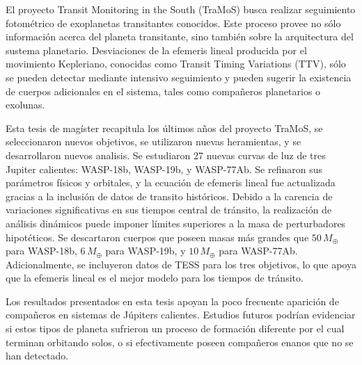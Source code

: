 \begin{resumen}
El proyecto Transit Monitoring in the South (TraMoS) busca realizar seguimiento fotométrico de exoplanetas transitantes conocidos. Este proceso provee no sólo información acerca del planeta transitante, sino también sobre la arquitectura del sustema planetario. Desviaciones de la efemeris lineal producida por el movimiento Kepleriano, conocidas como Transit Timing Variations (TTV), sólo se pueden detectar mediante intensivo seguimiento y pueden sugerir la existencia de cuerpos adicionales en el sistema, tales como compañeros planetarios o exolunas.

Esta tesis de magíster recapitula los últimos años del proyecto TraMoS, se seleccionaron nuevos objetivos, se utilizaron nuevas heramientas, y se desarrollaron nuevos analisis. Se estudiaron 27 nuevas curvas de luz de tres Jupiter calientes: WASP-18b, WASP-19b, y WASP-77Ab. Se refinaron sus parámetros físicos y orbitales, y la ecuación de efemeris lineal fue actualizada gracias a la inclusión de datos de transito históricos. Debido a la carencia de variaciones significativas en sus tiempos central de tránsito, la realización de análisis dinámicos puede imponer límites superiores a la masa de perturbadores hipotéticos. Se descartaron cuerpos que poseen masas más grandes que $50\,M_{\oplus}$ para WASP-18b, $6\,M_{\oplus}$ para WASP-19b, y $10\,M_{\oplus}$ para WASP-77Ab. Adicionalmente, se incluyeron datos de TESS para los tres objetivos, lo que apoya que la efemeris lineal es el mejor modelo para los tiempos de tránsito.

Los resultados presentados en esta tesis apoyan la poco frecuente aparición de compañeros en sistemas de Júpiters calientes. Estudios futuros podrían evidenciar si estos tipos de planeta sufrieron un proceso de formación diferente por el cual terminan orbitando solos, o si efectivamente poseen compañeros enanos que no se han detectado.
\end{resumen}

